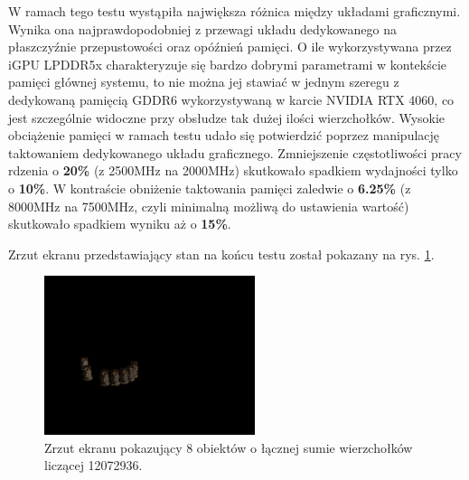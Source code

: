 W ramach tego testu wystąpiła największa różnica między układami graficznymi. Wynika ona najprawdopodobniej z przewagi układu dedykowanego na płaszczyźnie przepustowości oraz opóźnień pamięci. O ile wykorzystywana przez iGPU LPDDR5x charakteryzuje się bardzo dobrymi parametrami w kontekście pamięci głównej systemu, to nie można jej stawiać w jednym szeregu z dedykowaną pamięcią GDDR6 wykorzystywaną w karcie NVIDIA RTX 4060, co jest szczególnie widoczne przy obsłudze tak dużej ilości wierzchołków. Wysokie obciążenie pamięci w ramach testu udało się potwierdzić poprzez manipulację taktowaniem dedykowanego układu graficznego. Zmniejszenie częstotliwości pracy rdzenia o \textbf{20\%} (z 2500MHz na 2000MHz) skutkowało spadkiem wydajności tylko o \textbf{10\%}. W kontraście obniżenie taktowania pamięci zaledwie o \textbf{6.25\%} (z 8000MHz na 7500MHz, czyli minimalną możliwą do ustawienia wartość) skutkowało spadkiem wyniku aż o \textbf{15\%}.

Zrzut ekranu przedstawiający stan na końcu testu został pokazany na rys. \ref{demo_test_vertex}.

\begin{figure}[h!]
	\centering
	\includegraphics[width=0.55\textwidth]{images/demo_test_vertex.png}
	\caption{Zrzut ekranu pokazujący 8 obiektów o łącznej sumie wierzchołków liczącej 12072936.}
	\label{demo_test_vertex}
\end{figure}
